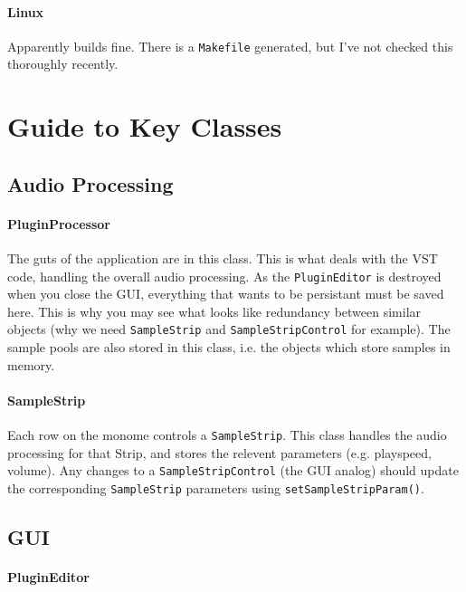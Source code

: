 \documentclass[10pt,a4paper]{report}
\begin{document}
\paragraph{Linux}

Apparently builds fine. There is a \texttt{Makefile} generated, but I've not checked this thoroughly recently.

\section{Guide to Key Classes}

\subsection{Audio Processing}

\paragraph{PluginProcessor}

The guts of the application are in this class. This is what deals with the VST code, handling the overall audio processing. As the \texttt{PluginEditor} is destroyed when you close the GUI, everything that wants to be persistant must be saved here. This is why you may see what looks like redundancy between similar objects (why we need \texttt{SampleStrip} and \texttt{SampleStripControl} for example). The sample pools are also stored in this class, i.e. the objects which store samples in memory.

\paragraph{SampleStrip}

Each row on the monome controls a \texttt{SampleStrip}. This class handles the audio processing for that Strip, and stores the relevent parameters (e.g. playspeed, volume). Any changes to a \texttt{SampleStripControl} (the GUI analog) should update the corresponding \texttt{SampleStrip} parameters using \texttt{setSampleStripParam()}. 

\subsection{GUI}

\paragraph{PluginEditor}
\end{document}

